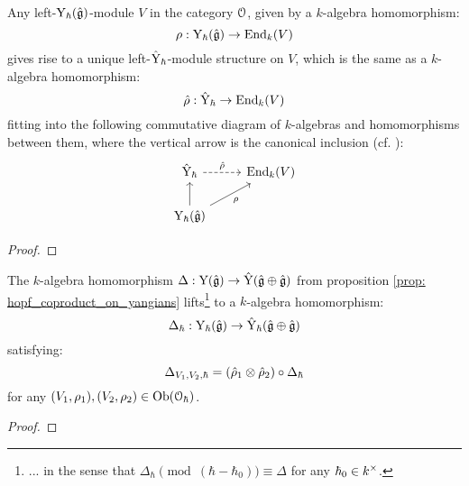        \begin{lemma} \label{lemma: lifting_representations_of_formal_affine_yangians_to_root_grading_completions}
            Any left-$\mathrm{Y}_{\hbar}(\hat{\mathfrak{g}})$-module $V$ in the category $\mathcal{O}$, given by a $k$-algebra homomorphism:
                $$\rho: \mathrm{Y}_{\hbar}(\hat{\mathfrak{g}}) \to \mathrm{End}_k(V)$$
            gives rise to a unique left-$\hat{\mathrm{Y}}_{\hbar}$-module structure on $V$, which is the same as a $k$-algebra homomorphism:
                $$\hat{\rho}: \hat{\mathrm{Y}}_{\hbar} \to \mathrm{End}_k(V)$$
            fitting into the following commutative diagram of $k$-algebras and homomorphisms between them, where the vertical arrow is the canonical inclusion (cf. \cite[Section 5, Lemma 5.3]{guay_nakajima_wendlandt_affine_yangian_coproduct}):
                $$
                    \begin{tikzcd}
                	{\hat{\rmY}_{\hbar}} & {\End_k(V)} \\
                	{\rmY_{\hbar}(\hat{\g})}
                	\arrow[from=2-1, to=1-1]
                	\arrow["{\hat{\rho}}", dashed, from=1-1, to=1-2]
                	\arrow["\rho"', from=2-1, to=1-2]
                    \end{tikzcd}
                $$
        \end{lemma}
            \begin{proof}
                
            \end{proof}
        \begin{theorem} \label{theorem: hopf_coproduct_on_formal_yangians}
            The $k$-algebra homomorphism $\Delta: \mathrm{Y}(\hat{\mathfrak{g}}) \to \hat{\mathrm{Y}}(\hat{\mathfrak{g}} \oplus \hat{\mathfrak{g}})$ from proposition \ref{prop: hopf_coproduct_on_yangians} lifts\footnote{... in the sense that $\Delta_{\hbar} \pmod{(\hbar - \hbar_0)} \equiv \Delta$ for any $\hbar_0 \in k^{\x}$.} to a $k$-algebra homomorphism:
                $$\Delta_{\hbar}: \mathrm{Y}_{\hbar}(\hat{\mathfrak{g}}) \to \hat{\mathrm{Y}}_{\hbar}(\hat{\mathfrak{g}} \oplus \hat{\mathfrak{g}})$$
            satisfying:
                $$\Delta_{V_1, V_2, \hbar} = (\hat{\rho}_1 \tensor \hat{\rho}_2) \circ \Delta_{\hbar}$$
            for any $(V_1, \rho_1), (V_2, \rho_2) \in \mathrm{Ob}(\mathcal{O}_{\hbar})$.
        \end{theorem}
            \begin{proof}
                
            \end{proof}
        
